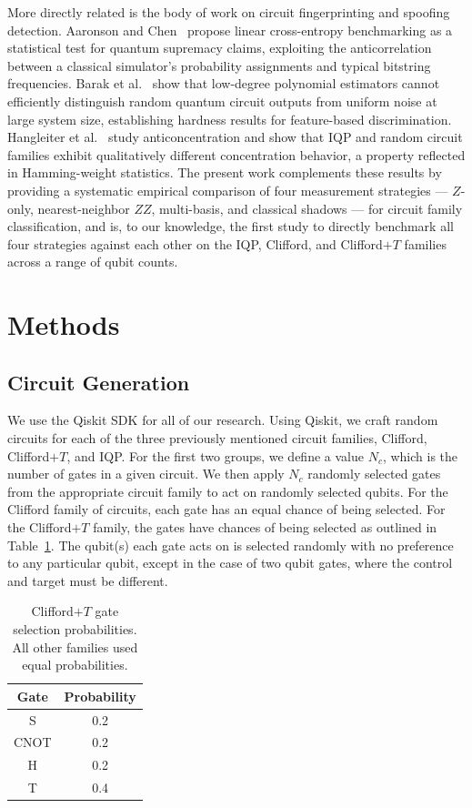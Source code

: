 \documentclass[conference]{IEEEtran}
\begin{document}
More directly related is the body of work on circuit fingerprinting and spoofing detection.
Aaronson and Chen~\cite{AaronsonChen2017} propose linear cross-entropy benchmarking as a statistical test for quantum supremacy claims, exploiting the anticorrelation between a classical simulator's probability assignments and typical bitstring frequencies.
Barak et al.~\cite{BarakEtAl2021} show that low-degree polynomial estimators cannot efficiently distinguish random quantum circuit outputs from uniform noise at large system size, establishing hardness results for feature-based discrimination.
Hangleiter et al.~\cite{HangleiterEtAl2019} study anticoncentration and show that IQP and random circuit families exhibit qualitatively different concentration behavior, a property reflected in Hamming-weight statistics.
The present work complements these results by providing a systematic empirical comparison of four measurement strategies --- $Z$-only, nearest-neighbor $ZZ$, multi-basis, and classical shadows --- for circuit family classification, and is, to our knowledge, the first study to directly benchmark all four strategies against each other on the IQP, Clifford, and Clifford$+T$ families across a range of qubit counts.

\section{Methods}
\label{sec:methods}

\subsection{Circuit Generation}

We use the Qiskit SDK \cite{qiskit2024} for all of our research. Using Qiskit, we craft random circuits 
for each of the three previously mentioned circuit families, Clifford, Clifford$+T$, and IQP.
For the first two groups, we define a value $N_c$, which is the number of gates in a given circuit. We
then apply $N_c$ randomly selected gates from the appropriate circuit family to act on randomly selected 
qubits. For the Clifford family of circuits, each gate has an equal chance of being selected. For the 
Clifford$+T$ family, the gates have chances of being selected as outlined in Table~\ref{tab:cliffordT_gate_distros}.
The qubit(s) each gate acts on is selected randomly with no preference to any particular qubit, except 
in the case of two qubit gates, where the control and target must be different.

\begin{table}[htbp]
\centering
\label{tab:cliffordT_gate_distros}
\caption{Clifford$+T$ gate selection probabilities. All other families used equal probabilities.}
\begin{tabular}{|c|c|}\hline
\textbf{Gate} & \textbf{Probability} \\ \hline
 S & 0.2 \\ \hline
 CNOT & 0.2 \\ \hline
 H & 0.2 \\ \hline
 T & 0.4 \\ \hline
\end{tabular}
\end{table}
\end{document}
